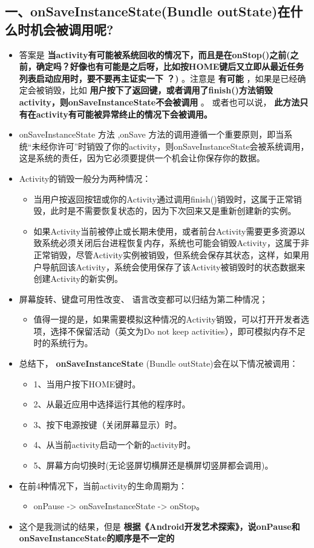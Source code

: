 \documentclass[9pt, b5paper]{article}
\begin{document}
\subsection{一、onSaveInstanceState(Bundle outState)在什么时机会被调用呢?}
\label{sec-11-1}
\begin{itemize}
\item 答案是 \textbf{当activity有可能被系统回收的情况下，而且是在onStop()之前(之前，确定吗？好像也有可能是之后呀，比如按HOME键后又立即从最近任务列表启动应用时，要不要再主证实一下 ？)} 。注意是 \textbf{有可能} ，如果是已经确定会被销毁，比如 \textbf{用户按下了返回键，或者调用了finish()方法销毁activity，则onSaveInstanceState不会被调用} 。 或者也可以说， \textbf{此方法只有在activity有可能被异常终止的情况下会被调用。}
\item onSaveInstanceState 方法 ,onSave 方法的调用遵循一个重要原则，即当系统“未经你许可”时销毁了你的activity，则onSaveInstanceState会被系统调用，这是系统的责任，因为它必须要提供一个机会让你保存你的数据。
\item Activity的销毁一般分为两种情况：
\begin{itemize}
\item 当用户按返回按钮或你的Activity通过调用finish()销毁时，这属于正常销毁，此时是不需要恢复状态的，因为下次回来又是重新创建新的实例。
\item 如果Activity当前被停止或长期未使用，或者前台Activity需要更多资源以致系统必须关闭后台进程恢复内存，系统也可能会销毁Activity，这属于非正常销毁，尽管Activity实例被销毁，但系统会保存其状态，这样，如果用户导航回该Activity，系统会使用保存了该Activity被销毁时的状态数据来创建Activity的新实例。
\end{itemize}
\item 屏幕旋转、键盘可用性改变、 语言改变都可以归结为第二种情况；
\begin{itemize}
\item 值得一提的是，如果需要模拟这种情况的Activity销毁，可以打开开发者选项，选择不保留活动（英文为Do not keep activities），即可模拟内存不足时的系统行为。
\end{itemize}
\item 总结下， \textbf{onSaveInstanceState} (Bundle outState)会在以下情况被调用：
\begin{itemize}
\item 1、当用户按下HOME键时。
\item 2、从最近应用中选择运行其他的程序时。
\item 3、按下电源按键（关闭屏幕显示）时。
\item 4、从当前activity启动一个新的activity时。
\item 5、屏幕方向切换时(无论竖屏切横屏还是横屏切竖屏都会调用)。
\end{itemize}
\item 在前4种情况下，当前activity的生命周期为：
\begin{itemize}
\item onPause -> onSaveInstanceState -> onStop。
\end{itemize}
\item 这个是我测试的结果，但是 \textbf{根据《Android开发艺术探索》，说onPause和onSaveInstanceState的顺序是不一定的}
\end{itemize}
\end{document}
